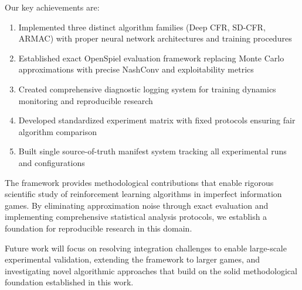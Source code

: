 \documentclass[10pt,twocolumn,conference]{IEEEtran}
\begin{document}
Our key achievements are:
\begin{enumerate}
    \item Implemented three distinct algorithm families (Deep CFR, SD-CFR, ARMAC) with proper neural network architectures and training procedures
    \item Established exact OpenSpiel evaluation framework replacing Monte Carlo approximations with precise NashConv and exploitability metrics
    \item Created comprehensive diagnostic logging system for training dynamics monitoring and reproducible research
    \item Developed standardized experiment matrix with fixed protocols ensuring fair algorithm comparison
    \item Built single source-of-truth manifest system tracking all experimental runs and configurations
\end{enumerate}

The framework provides methodological contributions that enable rigorous scientific study of reinforcement learning algorithms in imperfect information games. By eliminating approximation noise through exact evaluation and implementing comprehensive statistical analysis protocols, we establish a foundation for reproducible research in this domain.

Future work will focus on resolving integration challenges to enable large-scale experimental validation, extending the framework to larger games, and investigating novel algorithmic approaches that build on the solid methodological foundation established in this work.
\end{document}
